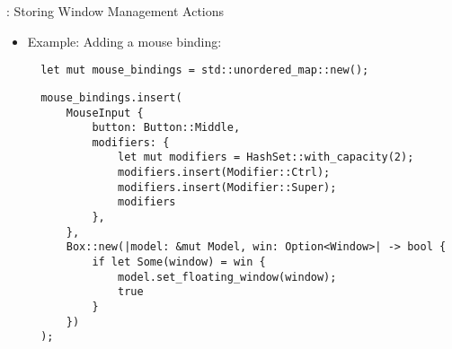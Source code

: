 \begin{frame}[fragile]{\underline{\cpp}: Storing Window Management Actions \hfill {\footnotesize \currentname}}


    \begin{itemize}

        \item Example: Adding a mouse binding:\\[3pt] 
\begin{verbatim}
  let mut mouse_bindings = std::unordered_map::new();
\end{verbatim}
\begin{verbatim}
  mouse_bindings.insert(
      MouseInput {
          button: Button::Middle,
          modifiers: {
              let mut modifiers = HashSet::with_capacity(2);
              modifiers.insert(Modifier::Ctrl);
              modifiers.insert(Modifier::Super);
              modifiers
          },
      },
      Box::new(|model: &mut Model, win: Option<Window>| -> bool {
          if let Some(window) = win {
              model.set_floating_window(window);
              true
          }
      })
  );
\end{verbatim}

    \end{itemize}

    \vfill

\end{frame}
